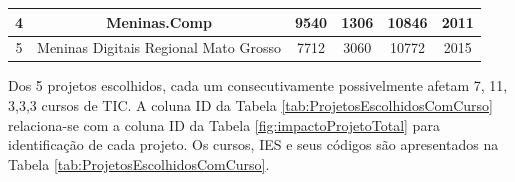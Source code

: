 \begin{table}[H]
{\begin{tabular}{|c|c|ccc|c|}
4                                            & Meninas.Comp                                                    & \multicolumn{1}{c|}{9540}                           & \multicolumn{1}{c|}{1306}                             & 10846 & 2011                                             \\ \hline
5                                            & Meninas Digitais Regional Mato Grosso                           & \multicolumn{1}{c|}{7712}                           & \multicolumn{1}{c|}{3060}                             & 10772 & 2015                                             \\ \hline
\end{tabular}%
}
\end{table}



Dos 5 projetos escolhidos, cada um consecutivamente possivelmente afetam 7, 11, 3,3,3 cursos de TIC. A coluna ID da Tabela \ref{tab:ProjetosEscolhidosComCurso} relaciona-se com a coluna ID da Tabela \ref{fig:impactoProjetoTotal} para identificação de cada projeto. Os cursos, IES e seus códigos são apresentados na Tabela \ref{tab:ProjetosEscolhidosComCurso}.

